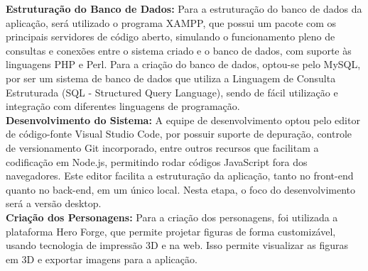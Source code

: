 \textbf{Estruturação do Banco de Dados:} Para a estruturação do banco de dados da aplicação, será utilizado o programa XAMPP, que possui um pacote com os principais servidores de código aberto, simulando o funcionamento pleno de consultas e conexões entre o sistema criado e o banco de dados, com suporte às linguagens PHP e Perl. Para a criação do banco de dados, optou-se pelo MySQL, por ser um sistema de banco de dados que utiliza a Linguagem de Consulta Estruturada (SQL - Structured Query Language), sendo de fácil utilização e integração com diferentes linguagens de programação.
\\

\textbf{Desenvolvimento do Sistema:} A equipe de desenvolvimento optou pelo editor de código-fonte Visual Studio Code, por possuir suporte de depuração, controle de versionamento Git incorporado, entre outros recursos que facilitam a codificação em Node.js, permitindo rodar códigos JavaScript fora dos navegadores. Este editor facilita a estruturação da aplicação, tanto no front-end quanto no back-end, em um único local. Nesta etapa, o foco do desenvolvimento será a versão desktop.
\\

\textbf{Criação dos Personagens:} Para a criação dos personagens, foi utilizada a plataforma Hero Forge, que permite projetar figuras de forma customizável, usando tecnologia de impressão 3D e na web. Isso permite visualizar as figuras em 3D e exportar imagens para a aplicação.
\\